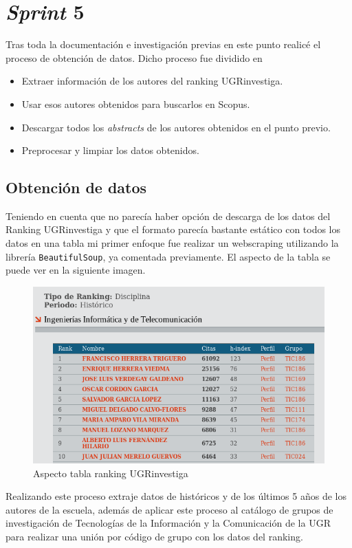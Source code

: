 \section{\textit{Sprint} 5}
Tras toda la documentación e investigación previas en este punto realicé el proceso de obtención de datos. Dicho proceso fue dividido en 
\begin{itemize}
	\item Extraer información de los autores del ranking UGRinvestiga.
	\item Usar esos autores obtenidos para buscarlos en Scopus.
	\item Descargar todos los \textit{abstracts} de los autores obtenidos en el punto previo.
	\item Preprocesar y limpiar los datos obtenidos.
\end{itemize}

\subsection{Obtención de datos}

Teniendo en cuenta que no parecía haber opción de descarga de los datos del Ranking UGRinvestiga y que el formato parecía bastante estático con todos los datos en una tabla mi primer enfoque fue realizar un \gls{webscraping} utilizando la librería \texttt{BeautifulSoup}, ya comentada previamente. El aspecto de la tabla se puede ver en la siguiente imagen.


\begin{figure}[h!]
	
	\centering
	\includegraphics[width=0.9\linewidth]{imagenes/aspectoRankingUGRi}
	\caption{Aspecto tabla ranking UGRinvestiga}
\end{figure}

Realizando este proceso extraje datos de históricos y de los últimos 5 años de los autores de la escuela, además de aplicar este proceso al catálogo de grupos de investigación de Tecnologías de la Información y la Comunicación de la  \acrshort{UGR} para realizar una unión por código de grupo con los datos del ranking.

